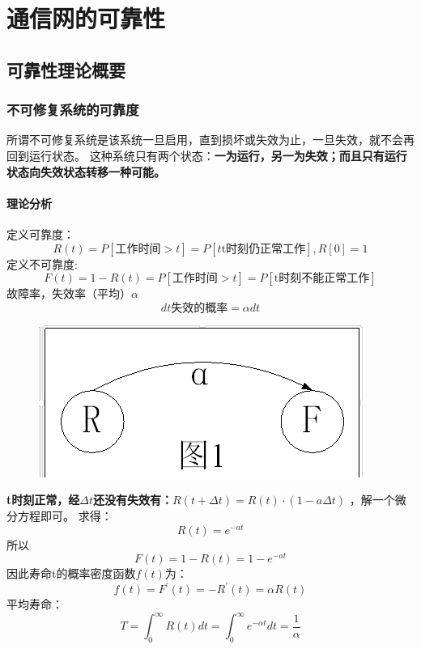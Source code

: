 \chapter{通信网的可靠性}
\section{可靠性理论概要
}
\subsection{不可修复系统的可靠度
}
所谓不可修复系统是该系统一旦启用，直到损坏或失效为止，一旦失效，就不会再回到运行状态。
这种系统只有两个状态：\textbf{一为运行，另一为失效；而且只有运行状态向失效状态转移一种可能。}\\
\subsubsection{理论分析}
定义可靠度：
\begin{equation}\label{key}
R(t) = P[\text{工作时间}>t] = P[t\text{t时刻仍正常工作}],R[0] = 1
\end{equation}
定义不可靠度:
\begin{equation}\label{key}
F(t) = 1 - R(t) =P[\text{工作时间}>t] =  P[\text{t时刻不能正常工作}]
\end{equation}
故障率，失效率（平均）$ \alpha $
\begin{equation}\label{key}
dt\text{失效的概率} = \alpha dt
\end{equation}
\begin{figure}[H]
	\centering
	\includegraphics[width=0.7\linewidth]{figures/screenshot085}
	\caption{}
	\label{fig:screenshot085}
\end{figure}

\textbf{t时刻正常，经$ \Delta t $还没有失效有：$ R(t+\Delta t)=R(t) ·(1-a\Delta t) $
}，解一个微分方程即可。
求得：
\begin{equation}\label{key}
R(t) = e^{-at}
\end{equation}
所以
\begin{equation}\label{key}
F(t) = 1-R(t) = 1-e^{-at}
\end{equation}
因此寿命t的概率密度函数$ f(t) $为：
\begin{equation}\label{key}
f(t) = F^{'}(t) = -R^{'}(t) = \alpha R(t)
\end{equation}
平均寿命：
\begin{equation}\label{key}
T  = \int_{0}^{\infty} R(t) dt = \int_{0}^{\infty} e^{-\alpha t} dt = \frac{1}{\alpha}
\end{equation}

